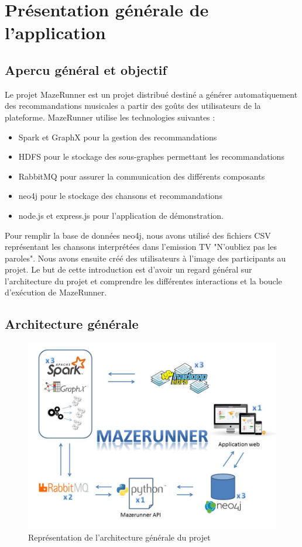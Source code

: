\section{Présentation générale de l'application}

\subsection{Apercu général et objectif}

Le projet MazeRunner est un projet distribué destiné a générer automatiquement des recommandations musicales a partir des goûts des utilisateurs de la plateforme.
MazeRunner utilise les technologies suivantes :
\begin{itemize}
  \item Spark et GraphX pour la gestion des recommandations
  \item HDFS pour le stockage des sous-graphes permettant les recommandations
  \item RabbitMQ pour assurer la communication des différents composants
  \item neo4j pour le stockage des chansons et recommandations
  \item node.js et express.js pour l'application de démonstration.
\end{itemize}

Pour remplir la base de données neo4j, nous avons utilisé des fichiers CSV représentant les chansons interprétées dans l'emission TV "N'oubliez pas les paroles".
Nous avons ensuite créé des utilisateurs à l'image des participants au projet. Le but de cette introduction est d'avoir un regard général sur l'architecture du projet et comprendre les différentes interactions et la boucle d'exécution de MazeRunner.

\subsection{Architecture générale}

\begin{figure}[h]
    \centering
    \includegraphics[scale=0.7]{pics/schema_architecture_global.jpg}
    \caption{Représentation de l'architecture générale du projet}
\end{figure}
\FloatBarrier

